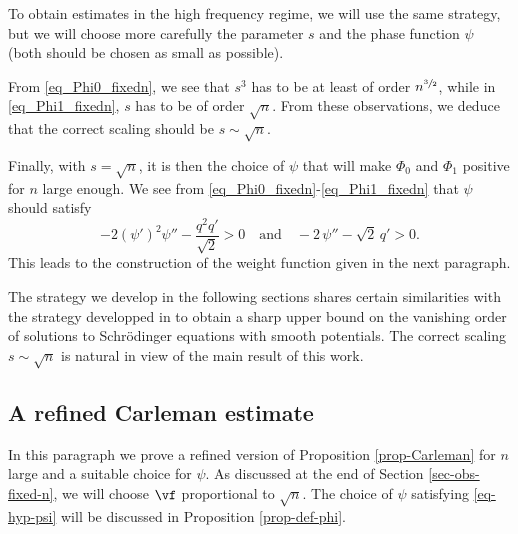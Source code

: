 To obtain estimates in the high frequency regime, we will use the same strategy, but we will choose more carefully the parameter $s$ and the phase function $\psi$ (both should be chosen as small as possible).

From \eqref{eq_Phi0_fixedn}, we see that $s^3$ has to be at least of order $n^{\sfrac{3}{2}}$, while in \eqref{eq_Phi1_fixedn}, $s$
has to be of order $\sqrt n$. From these observations, we deduce that the correct scaling should be $s \sim \sqrt n$.

Finally, with $s = \sqrt n$, it is then the choice of $\psi$ that will make $\Phi_0$ and $\Phi_1$ positive for $n$ large enough.
We see from \eqref{eq_Phi0_fixedn}-\eqref{eq_Phi1_fixedn} that $\psi$ should satisfy
\begin{equation} \label{eq-hyp-psi}
-2 (\psi')^2 \psi'' - \frac{q^2q'}{\sqrt{2}} > 0 \quad \text{and} \quad - 2\,\psi'' - \sqrt{2}\, q' >0.
\end{equation}
This leads to the construction of the weight function given in the next paragraph.

\begin{remark}
The strategy we develop in the following sections shares certain similarities with the strategy developped in \cite{Bakri12} to obtain a sharp upper bound on the vanishing order of solutions to Schrödinger equations with smooth potentials. The correct scaling $s \sim \sqrt n$ is natural in view of the main result of this work.
\end{remark}

\subsection{A refined Carleman estimate}

In this paragraph we prove a refined version of Proposition \ref{prop-Carleman} for $n$ large and a suitable choice for $\psi$. As discussed at the end of Section \ref{sec-obs-fixed-n}, we will choose $\vf$ proportional to $\sqrt n$. The choice of $\psi$ satisfying \eqref{eq-hyp-psi} will be discussed in Proposition \ref{prop-def-phi}.

